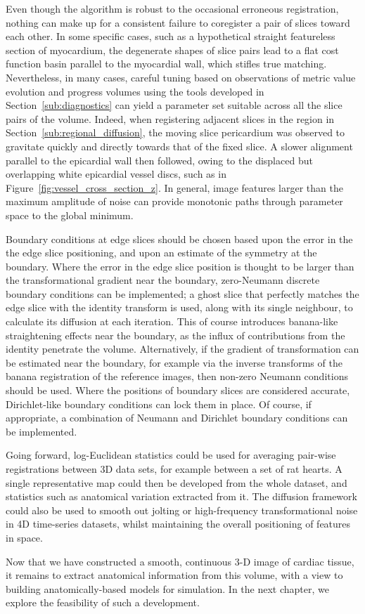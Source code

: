   Even though the algorithm is robust to the occasional erroneous registration, nothing can make up for a consistent failure to coregister a pair of slices toward each other. In some specific cases, such as a hypothetical straight featureless section of myocardium, the degenerate shapes of slice pairs lead to a flat cost function basin parallel to the myocardial wall, which stifles true matching. Nevertheless, in many cases, careful tuning based on observations of metric value evolution and progress volumes using the tools developed in Section~\ref{sub:diagnostics} can yield a parameter set suitable across all the slice pairs of the volume. Indeed, when registering adjacent slices in the region in Section~\ref{sub:regional_diffusion}, the moving slice pericardium was observed to gravitate quickly and directly towards that of the fixed slice. A slower alignment parallel to the epicardial wall then followed, owing to the displaced but overlapping white epicardial vessel discs, such as in Figure~\ref{fig:vessel_cross_section_z}. In general, image features larger than the maximum amplitude of noise can provide monotonic paths through parameter space to the global minimum.
  
  Boundary conditions at edge slices should be chosen based upon the error in the the edge slice positioning, and upon an estimate of the symmetry at the boundary. Where the error in the edge slice position is thought to be larger than the transformational gradient near the boundary, zero-Neumann discrete boundary conditions can be implemented; a ghost slice that perfectly matches the edge slice with the identity transform is used, along with its single neighbour, to calculate its diffusion at each iteration. This of course introduces banana-like straightening effects near the boundary, as the influx of contributions from the identity penetrate the volume. Alternatively, if the gradient of transformation can be estimated near the boundary, for example via the inverse transforms of the banana registration of the reference images, then non-zero Neumann conditions should be used. Where the positions of boundary slices are considered accurate, Dirichlet-like boundary conditions can lock them in place. Of course, if appropriate, a combination of Neumann and Dirichlet boundary conditions can be implemented.
  
  Going forward, log-Euclidean statistics could be used for averaging pair-wise registrations between 3D data sets, for example between a set of rat hearts. A single representative map could then be developed from the whole dataset, and statistics such as anatomical variation extracted from it. The diffusion framework could also be used to smooth out jolting or high-frequency transformational noise in 4D time-series datasets, whilst maintaining the overall positioning of features in space.
  
  Now that we have constructed a smooth, continuous 3-D image of cardiac tissue, it remains to extract anatomical information from this volume, with a view to building anatomically-based models for simulation. In the next chapter, we explore the feasibility of such a development.

